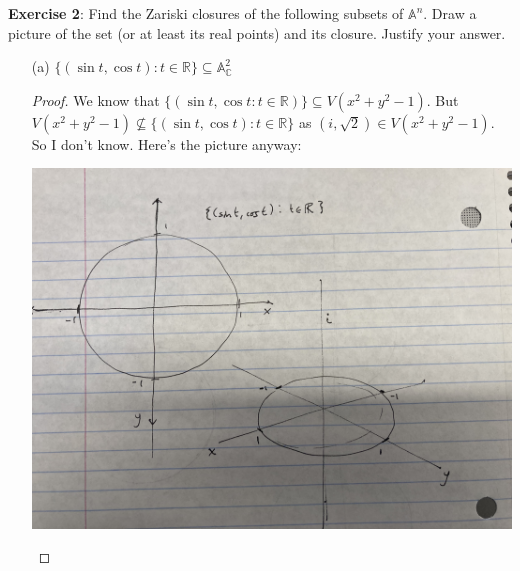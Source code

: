 \documentclass{article}
\begin{document}
\textbf{Exercise 2}: Find the Zariski closures of the following subsets of $\mathbb{A}^{n}$. Draw a picture of the set (or at least its real points) and its closure. Justify your answer.
    \begin{itemize}
        \item [(a)] $\{(\sin{t}, \cos{t}) : t \in \mathbb{R}\} \subseteq \mathbb{A}^{2}_{\mathbb{C}}$
            \begin{proof}
                We know that $\{(\sin{t}, \cos{t} : t \in \mathbb{R})\} \subseteq V(x^{2} + y^{2} - 1)$. But $V(x^{2} + y^{2} - 1) \not\subseteq \{(\sin{t}, \cos{t}) : t \in \mathbb{R}\}$ as $(i, \sqrt{2}) \in V(x^{2} + y^{2} - 1)$. So I don't know. Here's the picture anyway:
                    \begin{center}
                        \includegraphics[scale=.07]{third}
                    \end{center}
            \end{proof}


\end{itemize}
\end{document}
